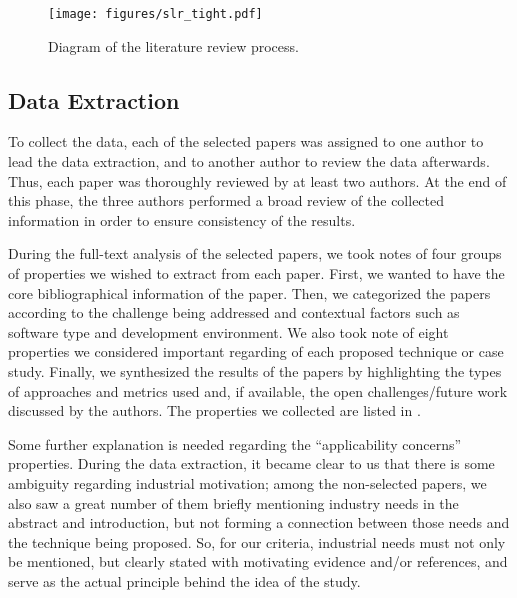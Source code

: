 \begin{figure}
  \center
  \texttt{[image: figures/slr\_tight.pdf]}
  \caption{Diagram of the literature review process.}
  \label{fig:literature_review}
\end{figure}



\subsection{Data Extraction}
\label{subsec:extraction}


To collect the data, each of the selected papers was assigned to one author to lead the data extraction, and to another author to review the data afterwards.
Thus, each paper was thoroughly reviewed by at least two authors.
At the end of this phase, the three authors performed a broad review of the collected information in order to ensure consistency of the results.

During the full-text analysis of the selected papers, we took notes of four groups of properties we wished to extract from each paper.
First, we wanted to have the core bibliographical information of the paper.
Then, we categorized the papers according to the \rt challenge being addressed and contextual factors such as software type and development environment.
We also took note of eight properties we considered important regarding \rea of each proposed technique or case study.
Finally, we synthesized the results of the papers by highlighting the types of approaches and metrics used and, if available, the open challenges/future work discussed by the authors.
The properties we collected are listed in .

Some further explanation is needed regarding the ``applicability concerns'' properties.
During the data extraction, it became clear to us that there is some ambiguity regarding industrial motivation; among the non-selected papers, we also saw a great number of them briefly mentioning industry needs in the abstract and introduction, but not forming a connection between those needs and the technique being proposed.
So, for our criteria, industrial needs must not only be mentioned, but clearly stated with motivating evidence and/or references, and serve as the actual principle behind the idea of the study.

